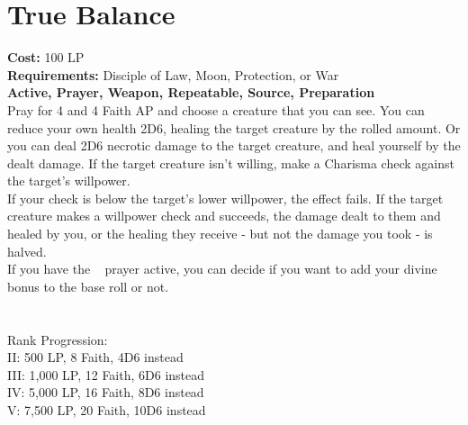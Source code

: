 \section{True Balance}\label{prayer:trueBalance}
\textbf{Cost:} 100 LP\\
\textbf{Requirements:} Disciple of Law, Moon, Protection, or War \\
\textbf{Active, Prayer, Weapon, Repeatable, Source, Preparation}\\
Pray for 4 and 4 Faith AP and choose a creature that you can see.
You can reduce your own health 2D6, healing the target creature by the rolled amount.
Or you can deal 2D6 necrotic damage to the target creature, and heal yourself by the dealt damage.
If the target creature isn't willing, make a Charisma check against the target's willpower.\\
If your check is below the target's lower willpower, the effect fails.
If the target creature makes a willpower check and succeeds, the damage dealt to them and healed by you, or the healing they receive - but not the damage you took - is halved.\\
If you have the ~ prayer active, you can decide if you want to add your divine bonus to the base roll or not.\\
\\
\\
Rank Progression:\\
II: 500 LP, 8 Faith, 4D6 instead\\
III: 1,000 LP, 12 Faith, 6D6 instead\\
IV: 5,000 LP, 16 Faith, 8D6 instead\\
V: 7,500 LP, 20 Faith, 10D6 instead\\